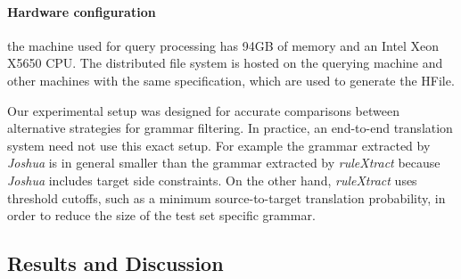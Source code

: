 \paragraph{Hardware configuration} the machine used for query processing has 94GB of
    memory and an Intel Xeon X5650 CPU. The distributed file system is hosted on
    the querying machine and other machines with the same specification, which
    are used to generate the HFile.

Our experimental setup was designed for accurate comparisons between alternative
strategies for grammar filtering. In practice, an end-to-end translation
system need not use this exact setup. For example the grammar extracted by \emph{Joshua} is
in general smaller than the grammar extracted by \emph{ruleXtract} because \emph{Joshua}
includes target side constraints. On the other hand, \emph{ruleXtract} uses threshold
cutoffs, such as a minimum source-to-target translation probability, %
in order to reduce the size of the test set specific grammar.

\subsection{Results and Discussion}

